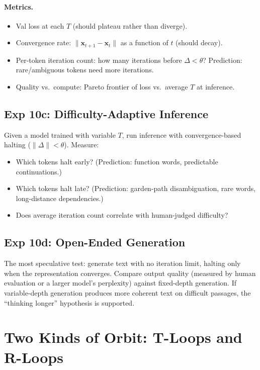 \documentclass[11pt, a4paper]{article}
\newcommand{\x}{\mathbf{x}}
\theoremstyle{plain}
\theoremstyle{definition}
\theoremstyle{remark}
\begin{document}
\paragraph{Metrics.}
\begin{itemize}[nosep]
    \item Val loss at each $T$ (should plateau rather than diverge).
    \item Convergence rate: $\|\x_{t+1} - \x_t\|$ as a function of $t$ (should decay).
    \item Per-token iteration count: how many iterations before $\Delta < \theta$? Prediction: rare/ambiguous tokens need more iterations.
    \item Quality vs.\ compute: Pareto frontier of loss vs.\ average $T$ at inference.
\end{itemize}

\subsection{Exp 10c: Difficulty-Adaptive Inference}

Given a model trained with variable $T$, run inference with convergence-based halting ($\|\Delta\| < \theta$).
Measure:
\begin{itemize}[nosep]
    \item Which tokens halt early? (Prediction: function words, predictable continuations.)
    \item Which tokens halt late? (Prediction: garden-path disambiguation, rare words, long-distance dependencies.)
    \item Does average iteration count correlate with human-judged difficulty?
\end{itemize}

\subsection{Exp 10d: Open-Ended Generation}

The most speculative test: generate text with no iteration limit, halting only when the representation converges.
Compare output quality (measured by human evaluation or a larger model's perplexity) against fixed-depth generation.
If variable-depth generation produces more coherent text on difficult passages, the ``thinking longer'' hypothesis is supported.

\section{Two Kinds of Orbit: T-Loops and R-Loops}
\end{document}
